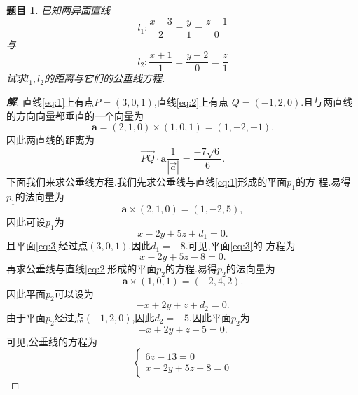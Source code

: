 \documentclass[a4paper]{article}
\newtheorem*{exe}{题目}
\newenvironment{exercise}
{\bigskip\begin{mdframed}\begin{exe}}
    {\end{exe}\end{mdframed}\bigskip}
\newcommand{\ov}{\overrightarrow}
\begin{document}
\begin{exercise}
  已知两异面直线
  \begin{equation}
    \label{eq:1}
    l_1:\frac{x-3}{2}=\frac{y}{1}=\frac{z-1}{0}
  \end{equation}
与
\begin{equation}
  \label{eq:2}
  l_2:\frac{x+1}{1}=\frac{y-2}{0}=\frac{z}{1}
\end{equation}
试求$l_1,l_2$的距离与它们的公垂线方程.
\end{exercise}
\begin{proof}[\textbf{解}]
直线\eqref{eq:1}上有点$P=(3,0,1)$,直线\eqref{eq:2}上有点
$Q=(-1,2,0)$.且与两直线的方向向量都垂直的一个向量为
$$
\mathbf{a}=(2,1,0)\times (1,0,1)=(1,-2,-1).
$$
因此两直线的距离为
$$
\ov{PQ}\cdot \mathbf{a}\frac{1}{|\ov{a}|}=\frac{-7 \sqrt{6}}{6}.
$$
下面我们来求公垂线方程.我们先求公垂线与直线\eqref{eq:1}形成的平面$p_{1}$的方
程.易得$p_1$的法向量为
$$
\mathbf{a}\times (2,1,0)=(1,-2,5),
$$
因此可设$p_1$为
\begin{equation}
  \label{eq:3}
  x-2y+5z+d_1=0.
\end{equation}
且平面\eqref{eq:3}经过点$(3,0,1)$,因此$d_1=-8$.可见,平面\eqref{eq:3}的
方程为
\begin{equation}
  \label{eq:4}
  x-2y+5z-8=0.
\end{equation}
再求公垂线与直线\eqref{eq:2}形成的平面$p_2$的方程.易得$p_2$的法向量为
$$
\mathbf{a}\times (1,0,1)=(-2,4,2).
$$
因此平面$p_2$可以设为
\begin{equation}
  \label{eq:5}
  -x+2y+z+d_2=0.
\end{equation}
由于平面$p_2$经过点$(-1,2,0)$,因此$d_2=-5$.因此平面$p_2$为
\begin{equation}
  \label{eq:6}
  -x+2y+z-5=0.
\end{equation}
可见,公垂线的方程为
\begin{equation}
  \label{eq:7}
  \begin{cases}
    6z-13=0\\
x-2y+5z-8=0
  \end{cases}
\end{equation}
\end{proof}
\end{document}

